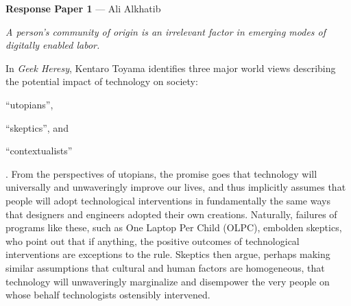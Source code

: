 \documentclass[11pt]{article}
\begin{document}
  \begin{center}
  \large{\bf Response Paper 1} --- 
  Ali Alkhatib
  \end{center}
  \textit{A person's community of origin is an irrelevant factor in emerging modes of digitally enabled labor.}




In \textit{Geek Heresy}, Kentaro Toyama identifies three major world views describing the potential impact of technology on society:
\begin{inlinelist}
  \item ``utopians'',
  \item ``skeptics'', and
  \item ``contextualists''
\end{inlinelist}
\cite{toyama2015geek}.
From the perspectives of utopians, the promise goes
that technology will universally and unwaveringly improve our lives, and thus implicitly
assumes that people will adopt technological interventions in fundamentally the same ways that designers and engineers adopted their own creations.
Naturally, failures of programs like these, such as One Laptop Per Child (OLPC), embolden skeptics, who point out that
if anything, the positive outcomes of technological interventions are exceptions to the rule.
Skeptics then argue,
perhaps making similar assumptions that cultural and human factors are homogeneous,
that technology will unwaveringly marginalize and disempower the very people on whose behalf technologists ostensibly intervened.
\end{document}
